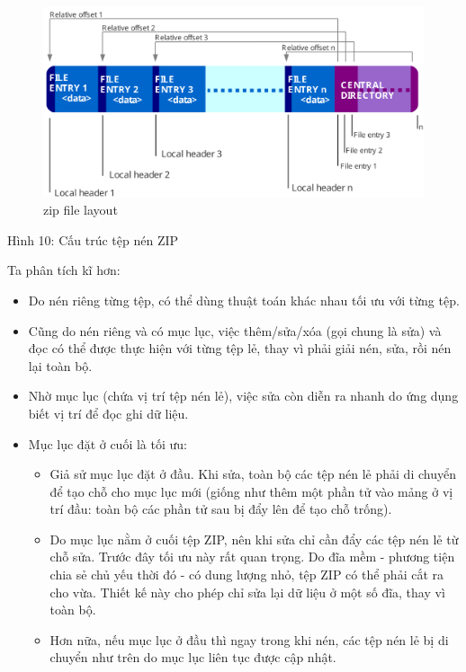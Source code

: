 \documentclass[
]{article}
\begin{document}
\begin{figure}
\centering
\includegraphics{../images/ZIP-64_Internal_Layout.svg}
\caption{zip file layout}
\end{figure}

Hình 10: Cấu trúc tệp nén ZIP

Ta phân tích kĩ hơn:

\begin{itemize}
\item
  Do nén riêng từng tệp, có thể dùng thuật toán khác nhau tối ưu với
  từng tệp.
\item
  Cũng do nén riêng và có mục lục, việc thêm/sửa/xóa (gọi chung là sửa)
  và đọc có thể được thực hiện với từng tệp lẻ, thay vì phải giải nén,
  sửa, rồi nén lại toàn bộ.
\item
  Nhờ mục lục (chứa vị trí tệp nén lẻ), việc sửa còn diễn ra nhanh do
  ứng dụng biết vị trí để đọc ghi dữ liệu.
\item
  Mục lục đặt ở cuối là tối ưu:

  \begin{itemize}
    \item
    Giả sử mục lục đặt ở đầu. Khi sửa, toàn bộ các tệp nén lẻ phải di
    chuyển để tạo chỗ cho mục lục mới (giống như thêm một phần tử vào
    mảng ở vị trí đầu: toàn bộ các phần tử sau bị đẩy lên để tạo chỗ
    trống).
  \item
    Do mục lục nằm ở cuối tệp ZIP, nên khi sửa chỉ cần đẩy các tệp nén
    lẻ từ chỗ sửa. Trước đây tối ưu này rất quan trọng. Do đĩa mềm -
    phương tiện chia sẻ chủ yếu thời đó - có dung lượng nhỏ, tệp ZIP có
    thể phải cắt ra cho vừa. Thiết kế này cho phép chỉ sửa lại dữ liệu ở
    một số đĩa, thay vì toàn bộ.
  \item
    Hơn nữa, nếu mục lục ở đầu thì ngay trong khi nén, các tệp nén lẻ bị
    di chuyển như trên do mục lục liên tục được cập nhật.
  \end{itemize}
\end{itemize}
\end{document}
